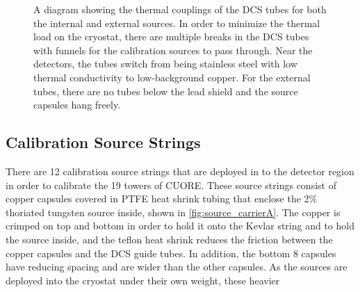 \begin{figure}[htbp]
    \caption[A diagram showing the thermal couplings of the DCS tubes for both the internal and external sources.]
    {A diagram showing the thermal couplings of the DCS tubes for both the internal and external sources.
    In order to minimize the thermal load on the cryostat, there are multiple breaks in the DCS tubes with funnels for the calibration sources to pass through.
    Near the detectors, the tubes switch from being stainless steel with low thermal conductivity to low-background copper.
    For the external tubes, there are no tubes below the lead shield and the source capsules hang freely.}
    \label{fig:dcs_thermal_coupling}
\end{figure}

\subsection{Calibration Source Strings}
There are 12 calibration source strings that are deployed in to the detector region in order to calibrate the 19 towers of CUORE. These source strings consist of copper capsules covered in PTFE heat shrink tubing that enclose the 2\% thoriated tungsten source inside, shown in \autoref{fig:source_carrierA}. The copper is crimped on top and bottom in order to hold it onto the Kevlar string and to hold the source inside, and the teflon heat shrink reduces the friction between the copper capsules and the DCS guide tubes. In addition, the bottom 8 capsules have reducing spacing and are wider than the other capsules. As the sources are deployed into the cryostat under their own weight, these heavier 

